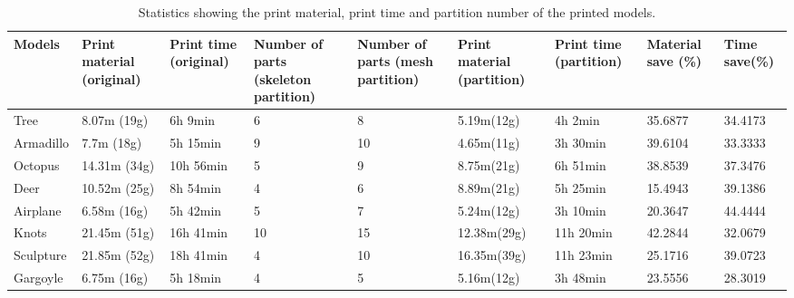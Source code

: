 \begin{table}[htb]

\begin{footnotesize}

\begin{center}

    \begin{tabular}{p{1cm} p{2cm} p{2cm} p{1.6cm} p{1.6cm} p{1.5cm} p{1.5cm} p{1.5cm} p{1.5cm}}

    \hline

     Models& Print material (original)& Print time (original)& Number of parts (skeleton partition)& Number of parts (mesh partition)& Print material (partition)& Print time (partition)& Material save (\%) &Time save(\%)\\ \hline
     Tree& 8.07m (19g)& 6h 9min &6 & 8 &5.19m(12g) & 4h 2min & 35.6877 &34.4173\\ \hline
     Armadillo& 7.7m (18g)& 5h 15min &9 & 10  &4.65m(11g) & 3h 30min & 39.6104 &33.3333\\ \hline
     Octopus& 14.31m (34g)& 10h 56min &5 & 9  &8.75m(21g) &6h 51min & 38.8539 &37.3476\\ \hline
     Deer& 10.52m (25g)& 8h 54min &4 & 6  &8.89m(21g) &5h 25min & 15.4943 &39.1386\\ \hline
     Airplane& 6.58m (16g)& 5h 42min &5 & 7 &5.24m(12g) &3h 10min & 20.3647 &44.4444\\ \hline
     Knots& 21.45m (51g)& 16h 41min &10 & 15 &12.38m(29g) &11h 20min & 42.2844 &32.0679\\ \hline
     Sculpture& 21.85m (52g)& 18h 41min &4 & 10 &16.35m(39g) &11h 23min & 25.1716 &39.0723\\ \hline
     Gargoyle& 6.75m (16g)& 5h 18min &4 & 5 &5.16m(12g) &3h 48min & 23.5556 &28.3019\\ \hline

  \hline

    \end{tabular}

\end{center}

\end{footnotesize}

\caption{Statistics showing the print material, print time and partition number of the printed models.}\label{tab:ertms:summary}

\end{table}


